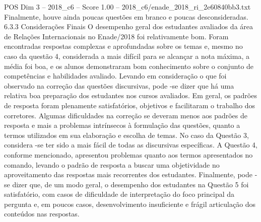 \begin{textsample}{POS Dim 3 – 2018\_c6 – Score 1.00 – 2018\_c6/enade\_2018\_ri\_2e60840bb3.txt}
Finalmente, houve ainda poucas questões em branco e poucas desconsideradas. 6.3.3 Considerações Finais O desempenho geral dos estudantes avaliados da área de Relações Internacionais no Enade/2018 foi relativamente bom.
Foram encontradas respostas complexas e aprofundadas sobre os temas e, mesmo no caso da questão 4, considerada a mais difícil para se alcançar a nota máxima, a média foi boa, e os alunos demonstraram bom conhecimento sobre o conjunto de competências e habilidades avaliado.
Levando em consideração o que foi observado na correção das questões discursivas, pode -se dizer que há uma relativa boa preparação dos estudantes nos cursos avaliados.
Em geral, os padrões de resposta foram plenamente satisfatórios, objetivos e facilitaram o trabalho dos corretores.
Algumas dificuldades na correção se deveram menos aos padrões de resposta e mais a problemas intrínsecos à formulação das questões, quanto a termos utilizados em sua elaboração e escolha de temas.
No caso da Questão 3, considera -se ter sido a mais fácil de todas as discursivas específicas.
A Questão 4, conforme mencionado, apresentou problemas quanto aos termos apresentados no comando, levando o padrão de resposta a buscar uma objetividade no aproveitamento das respostas mais recorrentes dos estudantes.
Finalmente, pode -se dizer que, de um modo geral, o desempenho dos estudantes na Questão 5 foi satisfatório, com casos de dificuldade de interpretação do foco principal da pergunta e, em poucos casos, desenvolvimento insuficiente e frágil articulação dos conteúdos nas respostas.

\end{textsample}
